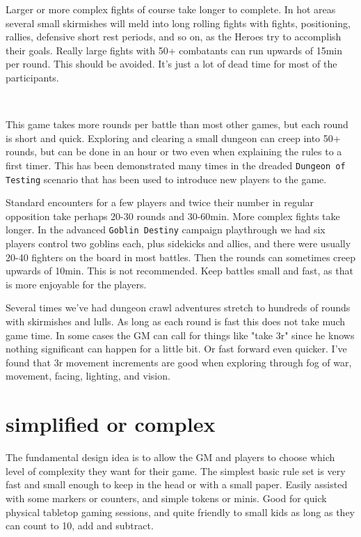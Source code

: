 Larger or more complex fights of course take longer to complete. In hot areas several small skirmishes will meld into long rolling fights with fights, positioning, rallies, defensive short rest periods, and so on, as the Heroes try to accomplish their goals.
Really large fights with 50+ combatants can run upwards of 15min per round. This should be avoided. It's just a lot of dead time for most of the participants.

\

This game takes more rounds per battle than most other games, but each round is short and quick. Exploring and clearing a small dungeon can creep into 50+ rounds, but can be done in an hour or two even when explaining the rules to a first timer. This has been demonstrated many times in the dreaded \texttt{Dungeon of Testing} scenario that has been used to introduce new players to the game.

Standard encounters for a few players and twice their number in regular opposition take perhaps 20-30 rounds and 30-60min. More complex fights take longer. In the advanced \texttt{Goblin Destiny} campaign playthrough we had six players control two goblins each, plus sidekicks and allies, and there were usually 20-40 fighters on the board in most battles. Then the rounds can sometimes creep upwards of 10min. This is not recommended. Keep battles small and fast, as that is more enjoyable for the players.

Several times we've had dungeon crawl adventures stretch to hundreds of rounds with skirmishes and lulls. As long as each round is fast this does not take much game time. In some cases the GM can call for things like "take 3r" since he knows nothing significant can happen for a little bit. Or fast forward even quicker. I've found that 3r movement increments are good when exploring through fog of war, movement, facing, lighting, and vision.


\section*{simplified or complex}
The fundamental design idea is to allow the GM and players to choose which level of complexity they want for their game. The simplest basic rule set is very fast and small enough to keep in the head or with a small paper. Easily assisted with some markers or counters, and simple tokens or minis. Good for quick physical tabletop gaming sessions, and quite friendly to small kids as long as they can count to 10, add and subtract.

